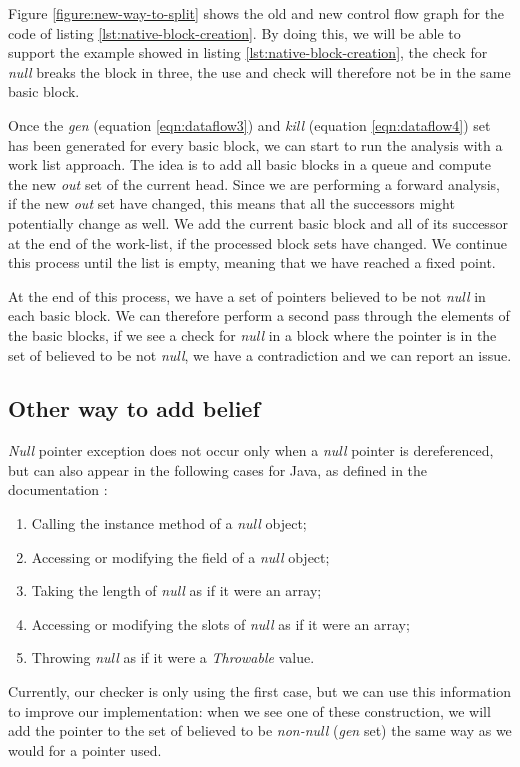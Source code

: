 Figure \ref{figure:new-way-to-split} shows the old and new control flow graph for the code of listing \ref{lst:native-block-creation}. 
By doing this, we will be able to support the example showed in listing \ref{lst:native-block-creation}, the check for \emph{null} breaks the block in three, the use and check will therefore not be in the same basic block.

Once the \emph{gen} (equation \ref{eqn:dataflow3}) and \emph{kill} (equation \ref{eqn:dataflow4}) set has been generated for every basic block, we can start to run the analysis with a work list approach.
The idea is to add all basic blocks in a queue and compute the new \emph{out} set of the current head. 
Since we are performing a forward analysis, if the new \emph{out} set have changed, this means that all the successors might potentially change as well. 
We add the current basic block and all of its successor at the end of the work-list, if the processed block sets have changed. 
We continue this process until the list is empty, meaning that we have reached a fixed point.

At the end of this process, we have a set of pointers believed to be not \emph{null} in each basic block.
We can therefore perform a second pass through the elements of the basic blocks, if we see a check for \emph{null} in a block where the pointer is in the set of believed to be not \emph{null}, we have a contradiction and we can report an issue.

\subsection{Other way to add belief}
\label{subsec:other_way_to_add_belief}

\emph{Null} pointer exception does not occur only when a \emph{null} pointer is dereferenced, but can also appear in the following cases for Java, as defined in the documentation \cite{OracleDoc:2019:Online}:

\begin{enumerate}
	\item Calling the instance method of a \emph{null} object;
	\item Accessing or modifying the field of a \emph{null} object;
	\item Taking the length of \emph{null} as if it were an array;
	\item Accessing or modifying the slots of \emph{null} as if it were an array;
	\item Throwing \emph{null} as if it were a \emph{Throwable} value.
\end{enumerate}
Currently, our checker is only using the first case, but we can use this information to improve our implementation: when we see one of these construction, we will add the pointer to the set of believed to be \emph{non-null} (\emph{gen} set) the same way as we would for a pointer used.


